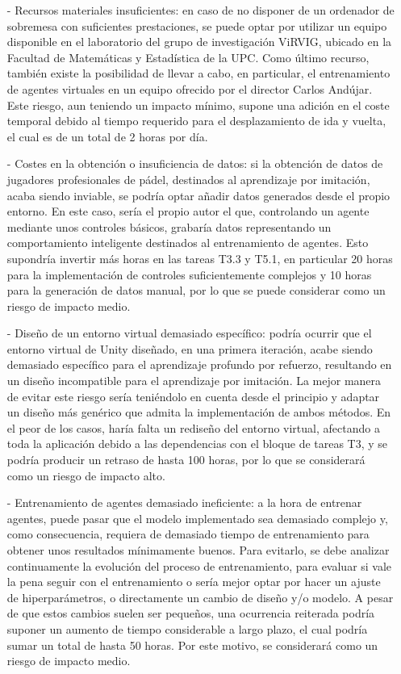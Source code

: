 \begin{enumerate}
    \item[-] Recursos materiales insuficientes: en caso de no disponer de un ordenador de sobremesa con suficientes prestaciones, se puede optar por utilizar un equipo disponible en el laboratorio del grupo de investigación ViRVIG, ubicado en la Facultad de Matemáticas y Estadística de la UPC. Como último recurso, también existe la posibilidad de llevar a cabo, en particular, el entrenamiento de agentes virtuales en un equipo ofrecido por el director Carlos Andújar. Este riesgo, aun teniendo un impacto mínimo, supone una adición en el coste temporal debido al tiempo requerido para el desplazamiento de ida y vuelta, el cual es de un total de 2 horas por día.
    \item[-] Costes en la obtención o insuficiencia de datos: si la obtención de datos de jugadores profesionales de pádel, destinados al aprendizaje por imitación, acaba siendo inviable, se podría optar añadir datos generados desde el propio entorno. En este caso, sería el propio autor el que, controlando un agente mediante unos controles básicos, grabaría datos representando un comportamiento inteligente destinados al entrenamiento de agentes. Esto supondría invertir más horas en las tareas T3.3 y T5.1, en particular 20 horas para la implementación de controles suficientemente complejos y 10 horas para la generación de datos manual, por lo que se puede considerar como un riesgo de impacto medio.
    \item[-] Diseño de un entorno virtual demasiado específico: podría ocurrir que el entorno virtual de Unity diseñado, en una primera iteración, acabe siendo demasiado específico para el aprendizaje profundo por refuerzo, resultando en un diseño incompatible para el aprendizaje por imitación. La mejor manera de evitar este riesgo sería teniéndolo en cuenta desde el principio y adaptar un diseño más genérico que admita la implementación de ambos métodos. En el peor de los casos, haría falta un rediseño del entorno virtual, afectando a toda la aplicación debido a las dependencias con el bloque de tareas T3, y se podría producir un retraso de hasta 100 horas, por lo que se considerará como un riesgo de impacto alto.
    \item[-] Entrenamiento de agentes demasiado ineficiente: a la hora de entrenar agentes, puede pasar que el modelo implementado sea demasiado complejo y, como consecuencia, requiera de demasiado tiempo de entrenamiento para obtener unos resultados mínimamente buenos. Para evitarlo, se debe analizar continuamente la evolución del proceso de entrenamiento, para evaluar si vale la pena seguir con el entrenamiento o sería mejor optar por hacer un ajuste de hiperparámetros, o directamente un cambio de diseño y/o modelo. A pesar de que estos cambios suelen ser pequeños, una ocurrencia reiterada podría suponer un aumento de tiempo considerable a largo plazo, el cual podría sumar un total de hasta 50 horas. Por este motivo, se considerará como un riesgo de impacto medio.
\end{enumerate}

